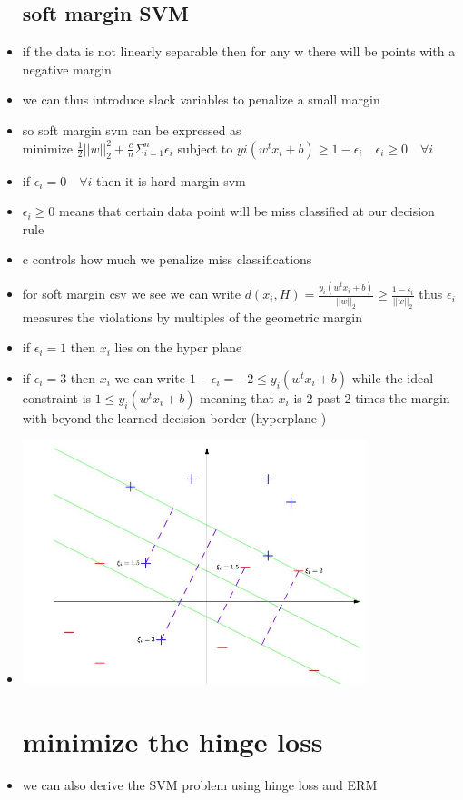 \documentclass{article}
\begin{document}
\begin{itemize}
\subsection{soft margin SVM}
\item if the data is not linearly separable then for any w there will be points with a negative margin 
\item we can thus introduce slack variables to penalize a small margin 
\item so soft margin svm can be expressed as \\minimize $\frac{1}{2}||w||_{2}^{2}+\frac{c}{n}\Sigma_{i=1}^{n}\epsilon_{i}$       subject to $yi(w^{t}x_i+b)\geq 1-\epsilon_{i}\quad \epsilon_{i}\geq 0\quad \forall i$
\item if $\epsilon_{i}=0\quad\forall i$ then it is hard margin svm 
\item $\epsilon_{i}\geq 0$ means that certain data point will be miss classified at our decision rule 
\item c controls how much we penalize miss classifications 
\item for soft margin csv we see we can write $d(x_i,H)=\frac{y_{i}(w^{t}x_i+b)}{||w||_{2}}\geq \frac{1-\epsilon_{i}}{||w||_{2}}$ thus $\epsilon_{i}$ measures the violations by multiples of the geometric margin 
\item if $\epsilon_{i}=1$ then $x_i$ lies on the hyper plane 
\item if $\epsilon_{i}=3$ then $x_i$ we can write $1-\epsilon_{i}=-2\leq y_{i}(w^{t}x_i+b)$ while the ideal constraint is $1\leq y_{i}(w^{t}x_i+b)$ meaning that $x_i$ is 2 past 2 times the margin with beyond the learned decision  border (hyperplane )
\item \includegraphics[width=10cm]{lecture_notes/lecture_4/immmages/l4_4.jpg}
\section{minimize the hinge loss}
\item we can also derive the SVM problem using hinge loss and ERM 

\end{itemize}
\end{document}
